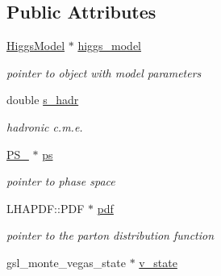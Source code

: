 \subsection*{Public Attributes}
\begin{DoxyCompactItemize}
\item 
\hypertarget{classintegrand__par_a9becf94ac239a82b946f53e36c75c83c}{}\hyperlink{classHiggsModel}{Higgs\+Model} $\ast$ \hyperlink{classintegrand__par_a9becf94ac239a82b946f53e36c75c83c}{higgs\+\_\+model}\label{classintegrand__par_a9becf94ac239a82b946f53e36c75c83c}

\begin{DoxyCompactList}\small\item\em pointer to object with model parameters \end{DoxyCompactList}\item 
\hypertarget{classintegrand__par_a02a52a8cc95edeadf423f181936617d0}{}double \hyperlink{classintegrand__par_a02a52a8cc95edeadf423f181936617d0}{s\+\_\+hadr}\label{classintegrand__par_a02a52a8cc95edeadf423f181936617d0}

\begin{DoxyCompactList}\small\item\em hadronic c.\+m.\+e. \end{DoxyCompactList}\item 
\hypertarget{classintegrand__par_a9c52a4045c079f7314cbc8a876f98238}{}\hyperlink{classPS__2}{P\+S\+\_} $\ast$ \hyperlink{classintegrand__par_a9c52a4045c079f7314cbc8a876f98238}{ps}\label{classintegrand__par_a9c52a4045c079f7314cbc8a876f98238}

\begin{DoxyCompactList}\small\item\em pointer to phase space \end{DoxyCompactList}\item 
\hypertarget{classintegrand__par_a082dc10e0e72baedade3f46cfffa4c15}{}L\+H\+A\+P\+D\+F\+::\+P\+D\+F $\ast$ \hyperlink{classintegrand__par_a082dc10e0e72baedade3f46cfffa4c15}{pdf}\label{classintegrand__par_a082dc10e0e72baedade3f46cfffa4c15}

\begin{DoxyCompactList}\small\item\em pointer to the parton distribution function \end{DoxyCompactList}\item 
\hypertarget{classintegrand__par_a3b5e2c8a2f3c33f0ebc594fd8f42210e}{}gsl\+\_\+monte\+\_\+vegas\+\_\+state $\ast$ \hyperlink{classintegrand__par_a3b5e2c8a2f3c33f0ebc594fd8f42210e}{v\+\_\+state}\label{classintegrand__par_a3b5e2c8a2f3c33f0ebc594fd8f42210e}


\end{DoxyCompactItemize}
